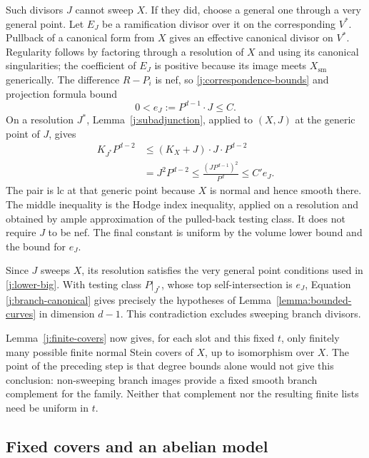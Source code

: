 \documentclass[12pt,a4paper,psamsfonts]{amsart}
\theoremstyle{definition}
\theoremstyle{plain}
\begin{document}
Such divisors $J$ cannot sweep $X$. If they did, choose a general
one through a very general point. Let $E_J$ be a ramification
divisor over it on the corresponding $V^*$. Pullback of a
canonical form from $X$ gives an effective canonical divisor on
$V^*$. Regularity follows by factoring through a resolution of
$X$ and using its canonical singularities; the coefficient of
$E_J$ is positive because its image meets $X_{\mathrm{sm}}$
generically. The difference $R-P_i$ is nef, so
\eqref{j:correspondence-bounds} and projection formula bound
\[
                    0<e_J:=P^{d-1}\cdot J\le C.
\]
On a resolution $J^*$, Lemma~\ref{j:subadjunction}, applied to
$(X,J)$ at the generic point of $J$, gives
\begin{equation}\label{j:branch-canonical}
 \begin{split}
 K_{J^*}P^{d-2}
 &\le(K_X+J)\cdot J\cdot P^{d-2}\\
 &=J^2P^{d-2}
 \le\frac{(JP^{d-1})^2}{P^d}
 \le C' e_J.
 \end{split}
\end{equation}
The pair is lc at that generic point because $X$ is normal and
hence smooth there. The middle inequality is the Hodge index
inequality, applied on a resolution and obtained by ample
approximation of the pulled-back testing class. It does not require
$J$ to be nef. The final constant is uniform by the volume lower
bound and the bound for $e_J$.

Since $J$ sweeps $X$, its resolution satisfies the very general
point conditions used in \eqref{j:lower-big}. With testing class
$P|_{J^*}$, whose top self-intersection is $e_J$, Equation
\eqref{j:branch-canonical} gives precisely the hypotheses of
Lemma~\ref{lemma:bounded-curves} in dimension $d-1$. This
contradiction excludes sweeping branch divisors.

Lemma~\ref{j:finite-covers} now gives, for each slot and this fixed
$t$, only finitely many possible finite normal Stein covers of
$X$, up to isomorphism over $X$. The point of the preceding step
is that degree bounds alone would not give this conclusion:
non-sweeping branch images provide a fixed smooth branch complement
for the family. Neither that complement nor the resulting finite
lists need be uniform in $t$.

\subsection{Fixed covers and an abelian model}
\end{document}
